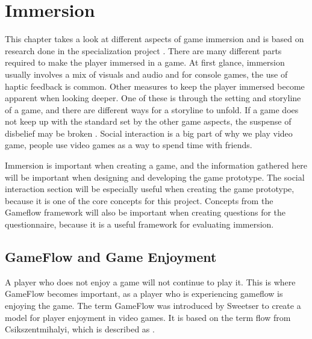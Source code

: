 \chapter{Immersion}
\label{ch:immersion}
This chapter takes a look at different aspects of game immersion and is based on research done in the specialization project \cite{hovind2015alternative}. There are many different parts required to make the player immersed in a game.
At first glance, immersion usually involves a mix of visuals and audio and for console games, the use of haptic feedback is common.
Other measures to keep the player immersed become apparent when looking deeper.
One of these is through the setting and storyline of a game, and there are different ways for a storyline to unfold.
If a game does not keep up with the standard set by the other game aspects, the suspense of disbelief may be broken \cite{overmars2012}. Social interaction is a big part of why we play video game, people use video games as a way to spend time with friends.

Immersion is important when creating a game, and the information gathered here will be important when designing and developing the game prototype. The social interaction section will be especially useful when creating the game prototype, because it is one of the core concepts for this project. Concepts from the Gameflow framework will also be important when creating questions for the questionnaire, because it is a useful framework for evaluating immersion.


\section{GameFlow and Game Enjoyment}
\label{immersionGameflow}
A player who does not enjoy a game will not continue to play it.
This is where GameFlow becomes important, as a player who is experiencing gameflow is enjoying the game.
The term GameFlow was introduced by Sweetser \cite{sweetser2005gameflow} to create a model for player enjoyment in video games.
It is based on the term flow from Csikszentmihalyi, which is described as .

